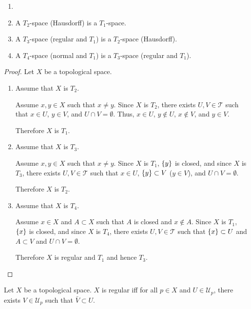 \documentclass[letterpaper,12pt,fleqn]{article}
\newcommand{\T}{\mathscr{T}}
\newcommand{\U}{\mathcal{U}}
\begin{document}
\begin{theorem}
  \begin{enumerate}
  \item[]
  \item A \(T_2\)-space (Hausdorff) is a \(T_1\)-space.
  \item A \(T_3\)-space (regular and \(T_1\)) is a \(T_2\)-space (Hausdorff).
  \item A \(T_4\)-space (normal and \(T_1\)) is a \(T_3\)-space (regular and \(T_1\)).
  \end{enumerate}
\end{theorem}

\begin{proof}
  Let \(X\) be a topological space.
  \begin{enumerate}
  \item Assume that \(X\) is \(T_2\).

    Assume \(x,y\in X\) such that \(x\ne y\).  Since \(X\) is \(T_2\), there exists \(U,V\in\T\) such that
    \(x\in U\), \(y\in V\), and \(U\cap V=\emptyset\).  Thus, \(x\in U\), \(y\notin U\), \(x\notin V\), and
    \(y\in V\).

    Therefore \(X\) is \(T_1\).

  \item Assume that \(X\) is \(T_3\).
    
    Assume \(x,y\in X\) such that \(x\ne y\).  Since \(X\) is \(T_1\), \(\{y\}\) is closed, and since \(X\) is
    \(T_3\), there exists \(U,V\in\T\) such that \(x\in U\), \(\{y\}\subset V\) (\(y\in V\)), and
    \(U\cap V=\emptyset\).

    Therefore \(X\) is \(T_2\).

  \item Assume that \(X\) is \(T_4\).

    Assume \(x\in X\) and \(A\subset X\) such that \(A\) is closed and \(x\notin A\).  Since \(X\) is \(T_1\),
    \(\{x\}\) is closed, and since \(X\) is \(T_4\), there exists \(U,V\in\T\) such that \(\{x\}\subset U\)
    and \(A\subset V\) and \(U\cap V=\emptyset\).

    Therefore \(X\) is regular and \(T_1\) and hence \(T_3\).
  \end{enumerate}
\end{proof}

\begin{theorem}
  Let \(X\) be a topological space.  \(X\) is regular iff for all \(p\in X\) and \(U\in\U_p\), there exists
  \(V\in\U_p\) such that \(\bar{V}\subset U\).
\end{theorem}
\end{document}
